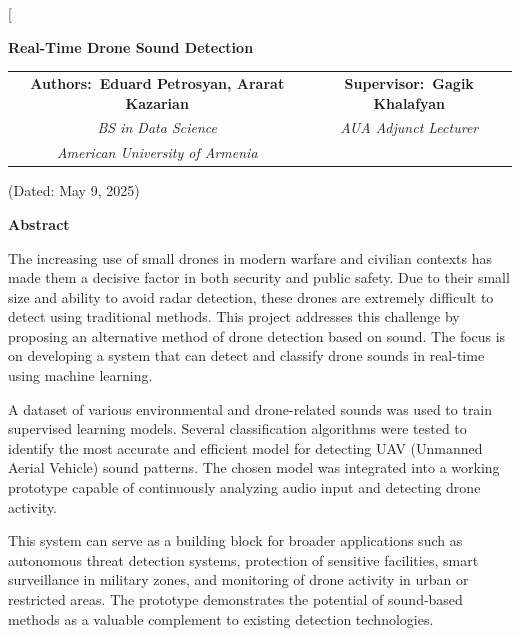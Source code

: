 \documentclass[12pt]{article}
\date{}
\begin{document}
\twocolumn[
\begin{center}
{\fontsize{12}{14}\selectfont\bfseries Real-Time Drone Sound Detection\par}

\vspace{1em}

\begin{tabular}{@{} c c @{}}
  {\fontsize{10}{12}\selectfont\bfseries Authors:\ 
     \normalfont\fontsize{9}{11}\selectfont Eduard Petrosyan, Ararat Kazarian} &
  {\fontsize{10}{12}\selectfont\bfseries Supervisor:\ 
     \normalfont\fontsize{9}{11}\selectfont Gagik Khalafyan} \\
  {\fontsize{9}{11}\selectfont\itshape BS in Data Science} &
  {\fontsize{9}{11}\selectfont\itshape AUA Adjunct Lecturer} \\
  {\fontsize{9}{11}\selectfont\itshape American University of Armenia} &
  {} \\
\end{tabular}

\vspace{1em}

{\fontsize{9}{11}\selectfont (Dated: May 9, 2025)\par}
\end{center}

\begin{center}
{\fontsize{9}{11}\bfseries Abstract}
\end{center}
\begin{center}
\begin{minipage}{0.95\textwidth}
\setlength{\parindent}{1.5em}
{\fontsize{9}{11}\selectfont
The increasing use of small drones in modern warfare and civilian contexts has made them a decisive factor in both security and public safety. Due to their small size and ability to avoid radar detection, these drones are extremely difficult to detect using traditional methods. This project addresses this challenge by proposing an alternative method of drone detection based on sound. The focus is on developing a system that can detect and classify drone sounds in real-time using machine learning. 

A dataset of various environmental and drone-related sounds was used to train supervised learning models. Several classification algorithms were tested to identify the most accurate and efficient model for detecting UAV (Unmanned Aerial Vehicle) sound patterns. The chosen model was integrated into a working prototype capable of continuously analyzing audio input and detecting drone activity. 

This system can serve as a building block for broader applications such as autonomous threat detection systems, protection of sensitive facilities, smart surveillance in military zones, and monitoring of drone activity in urban or restricted areas. The prototype demonstrates the potential of sound-based methods as a valuable complement to existing detection technologies.

}
\end{minipage}
\end{center}
\end{document}
